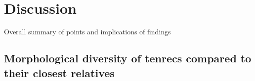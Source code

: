 \chapter{Discussion}
\label{chap:discussion}



\noindent
Overall summary of points and implications of findings


	



\section{Morphological diversity of tenrecs compared to their closest relatives}


